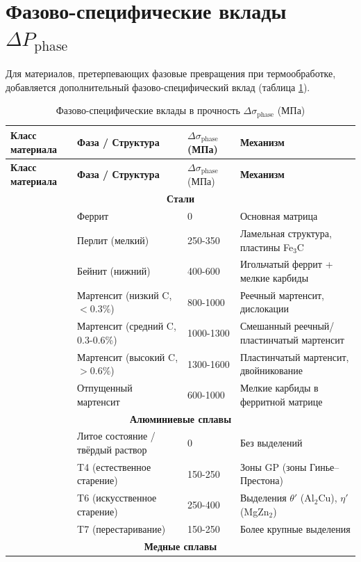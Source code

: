 \documentclass[12pt,a4paper]{article}
\begin{document}
	\section{Фазово-специфические вклады $\Delta P_{\text{phase}}$}
	Для материалов, претерпевающих фазовые превращения при термообработке, добавляется дополнительный фазово-специфический вклад (таблица \ref{tab:phase_contrib}).
	
	\begin{longtable}{p{3.5cm} p{3.0cm} p{3.0cm} p{4cm}}
		\caption{Фазово-специфические вклады в прочность $\Delta\sigma_{\text{phase}}$ (МПа)}\label{tab:phase_contrib}\\
		\toprule
		\textbf{Класс материала} & \textbf{Фаза / Структура} & $\Delta\sigma_{\text{phase}}$ (МПа) & \textbf{Механизм} \\
		\midrule
		\endfirsthead
		\toprule
		\textbf{Класс материала} & \textbf{Фаза / Структура} & $\Delta\sigma_{\text{phase}}$ (МПа) & \textbf{Механизм} \\
		\midrule
		\endhead
		\multicolumn{4}{c}{\textbf{Стали}} \\
		& Феррит & 0 & Основная матрица \\
		& Перлит (мелкий) & 250-350 & Ламельная структура, пластины Fe$_3$C \\
		& Бейнит (нижний) & 400-600 & Игольчатый феррит + мелкие карбиды \\
		& Мартенсит (низкий C, $<0.3\%$) & 800-1000 & Реечный мартенсит, дислокации \\
		& Мартенсит (средний C, 0.3-0.6\%) & 1000-1300 & Смешанный реечный/пластинчатый мартенсит \\
		& Мартенсит (высокий C, $>0.6\%$) & 1300-1600 & Пластинчатый мартенсит, двойникование \\
		& Отпущенный мартенсит & 600-1000 & Мелкие карбиды в ферритной матрице \\
		\hline
		\multicolumn{4}{c}{\textbf{Алюминиевые сплавы}} \\
		& Литое состояние / твёрдый раствор & 0 & Без выделений \\
		& T4 (естественное старение) & 150-250 & Зоны GP (зоны Гинье–Престона) \\
		& T6 (искусственное старение) & 250-400 & Выделения $\theta'$ (Al$_2$Cu), $\eta'$ (MgZn$_2$) \\
		& T7 (перестаривание) & 150-250 & Более крупные выделения \\
		\hline
		\multicolumn{4}{c}{\textbf{Медные сплавы}} \\

\end{longtable}
\end{document}
